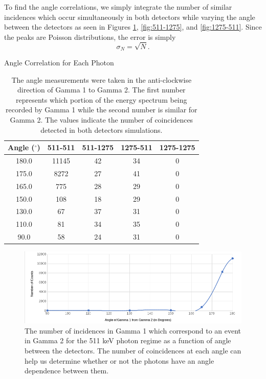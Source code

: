 \documentclass[10pt]{IEEEtran}
\begin{document}
    To find the angle correlations, we simply integrate the number of similar incidences which occur simultaneously in both detectors while varying the angle between the detectors as seen in Figures \ref{fig:511-511}, \ref{fig:511-1275}, and \ref{fig:1275-511}. Since the peaks are Poisson distributions, the error is simply\cite{bevington}  
    \begin{equation}
  		\sigma_N = \sqrt{N}.
    \end{equation}
\begin{center}
    \begin{table}[!hbpt]
        \begin{center}
        \normalsize{Angle Correlation for Each Photon}
        \begin{tabular}{|c|c|c|c|c|}
			\hline        	
        	Angle ($^\circ$) & 511-511 & 511-1275 & 1275-511 & 1275-1275 \\    
            \hline
            180.0 & 11145 & 42 & 34 & 0 \\
            \hline
            175.0 & 8272 & 27 & 41 & 0 \\
            \hline
            165.0 & 775 & 28 & 29 & 0 \\
            \hline
            150.0 & 108 & 18 & 29 & 0 \\
            \hline
            130.0 & 67 & 37 & 31 & 0 \\
            \hline
            110.0 & 81 & 34 & 35 & 0 \\
            \hline
            90.0 & 58 & 24 & 31 & 0 \\
            \hline
       \end{tabular}
       \caption{The angle measurements were taken in the anti-clockwise direction of Gamma 1 to Gamma 2. The first number represents which portion of the energy spectrum being recorded by Gamma 1 while the second number is similar for Gamma 2. The values indicate the number of coincidences detected in both detectors simulations.}
       \label{tab:angle}
    \end{center}
\end{table}        
	
    \begin{figure}[!hbtp]
		   	\includegraphics[width=\linewidth]{511-511}
			\caption{The number of incidences in Gamma 1 which correspond to an event in Gamma 2 for the 511 keV photon regime as a function of angle between the detectors. The number of coincidences at each angle can help us determine whether or not the photons have an angle dependence between them.}
			\label{fig:511-511}
    \end{figure}
\end{center}
\end{document}
